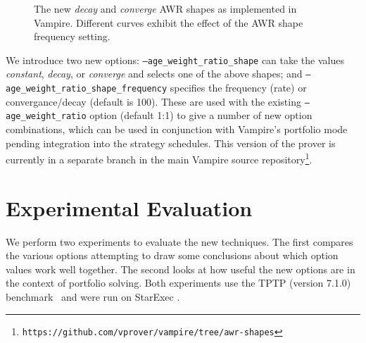 \documentclass{llncs}
\begin{document}
\begin{figure}[t]
	\caption{The new \emph{decay} and \emph{converge} AWR shapes as implemented in Vampire. Different curves exhibit the effect of the AWR shape frequency setting.}
	\label{fig:decay-and-converge}
\end{figure}

We introduce two new options: \texttt{--age\_weight\_ratio\_shape} can take the values \emph{constant}, \emph{decay}, or \emph{converge} and selects one of the above shapes; and \texttt{--age\_weight\_ratio\_shape\_frequency} specifies the frequency (rate) or convergance/decay (default is 100). These are used with the existing \texttt{--age\_weight\_ratio} option (default 1:1) to give a number of new option combinations, which can be used in conjunction with Vampire's portfolio mode pending integration into the strategy schedules.
This version of the prover is currently in a separate branch in the main Vampire source repository\footnote{\texttt{https://github.com/vprover/vampire/tree/awr-shapes}}.

\section{Experimental Evaluation}
\label{sec:experiments}

We perform two experiments to evaluate the new techniques. The first compares the various options attempting to draw some conclusions about which option values work well together. The second looks at how useful the new options are in the context of portfolio solving. Both experiments use the TPTP (version 7.1.0) benchmark~\cite{tptp} and were run on StarExec \cite{starexec}.
\end{document}
